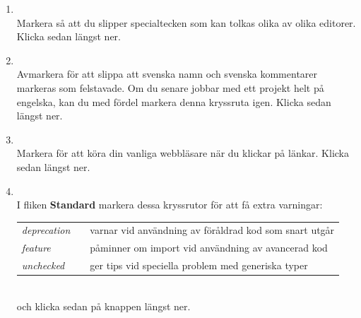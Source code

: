 \begin{enumerate}


\item \EclipsePrefsGeneral{}
\\ Markera  så att du slipper specialtecken som kan tolkas olika av olika editorer. Klicka sedan  längst ner.

\item \EclipsePrefsGeneral{}
\\  Avmarkera  för att slippa att svenska namn och svenska kommentarer markeras som felstavade. Om du senare jobbar med ett projekt helt på engelska, kan du med fördel markera denna kryssruta igen. Klicka sedan  längst ner.

\item \EclipsePrefsGeneral{}
\\ Markera  för att köra din vanliga webbläsare när du klickar på länkar. Klicka sedan  längst ner.

\item  \EclipsePrefs{}
\\ I fliken \textbf{Standard} markera dessa kryssrutor för att få extra varningar: \\
\begin{tabular}{l @{}l @{}l}
\textit{deprecation} & \FramedCheckmark{} & varnar vid användning av föråldrad kod som snart utgår \\
\textit{feature}     & \FramedCheckmark{} & påminner om import vid användning av avancerad kod  \\
\textit{unchecked}   & \FramedCheckmark{} & ger tips vid speciella problem med generiska typer \\
\end{tabular}\\
och klicka sedan på knappen  längst ner.


\end{enumerate}
